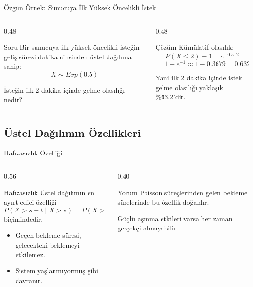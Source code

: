 \documentclass[light]{lutbeamer}
\begin{document}
\begin{frame}{Özgün Örnek: Sunucuya İlk Yüksek Öncelikli İstek}
\small
\begin{columns}[T,onlytextwidth]
    \begin{column}{0.48\textwidth}
        \begin{block}{Soru}
            Bir sunucuya ilk yüksek öncelikli isteğin geliş süresi dakika cinsinden üstel dağılıma sahip:
            \[
            X \sim Exp(0.5)
            \]

            \vspace{0.15cm}
            İsteğin ilk 2 dakika içinde gelme olasılığı nedir?
        \end{block}
    \end{column}
    \begin{column}{0.48\textwidth}
        \begin{exampleblock}{Çözüm}
            Kümülatif olasılık:
            \[
            P(X \le 2)=1-e^{-0.5 \cdot 2}
            \]
            \[
            =1-e^{-1}\approx 1-0.3679=0.6321
            \]

            Yani ilk 2 dakika içinde istek gelme olasılığı yaklaşık \%63.2'dir.
        \end{exampleblock}
    \end{column}
\end{columns}
\end{frame}

\subsection{Üstel Dağılımın Özellikleri}

\begin{frame}{Hafızasızlık Özelliği}
\small
\begin{columns}[T,onlytextwidth]
    \begin{column}{0.56\textwidth}
        \begin{block}{Hafızasızlık}
            Üstel dağılımın en ayırt edici özelliği
            \[
            P(X>s+t \mid X>s)=P(X>t)
            \]
            biçimindedir.
        \end{block}

        \begin{itemize}
            \item Geçen bekleme süresi, gelecekteki beklemeyi etkilemez.
            \item Sistem yaşlanmıyormuş gibi davranır.
        \end{itemize}
    \end{column}
    \begin{column}{0.40\textwidth}
        \begin{alertblock}{Yorum}
            Poisson süreçlerinden gelen bekleme sürelerinde bu özellik doğaldır.

            \vspace{0.15cm}
            Güçlü aşınma etkileri varsa her zaman gerçekçi olmayabilir.
        \end{alertblock}
    \end{column}
\end{columns}
\end{frame}
\end{document}
